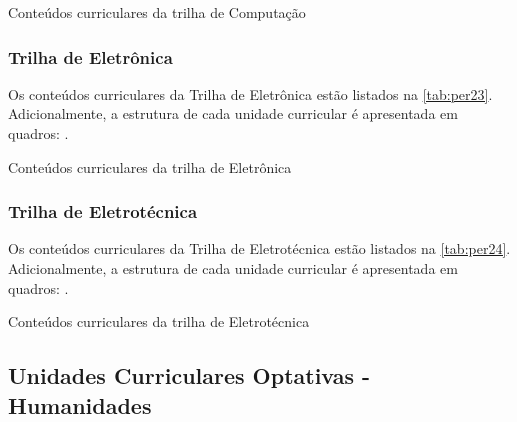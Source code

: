 \begin{table}[!htb]
	\centering\footnotesize
	\caption{Conteúdos curriculares da trilha de Computação}
	\label{tab:per22}
\end{table}

\clearpage

\subsubsection{Trilha de Eletrônica}

Os conteúdos curriculares da Trilha de Eletrônica estão listados na \autoref{tab:per23}. Adicionalmente, a estrutura de cada unidade curricular é apresentada em quadros: .

\begin{table}[!htb]
	\centering\footnotesize
	\caption{Conteúdos curriculares da trilha de Eletrônica}
	\label{tab:per23}
\end{table}

\clearpage

\subsubsection{Trilha de Eletrotécnica}

Os conteúdos curriculares da Trilha de Eletrotécnica estão listados na \autoref{tab:per24}. Adicionalmente, a estrutura de cada unidade curricular é apresentada em quadros: .

\begin{table}[!htb]
	\centering\footnotesize
	\caption{Conteúdos curriculares da trilha de Eletrotécnica}
	\label{tab:per24}
\end{table}

\clearpage

\subsection{Unidades Curriculares Optativas - Humanidades}

